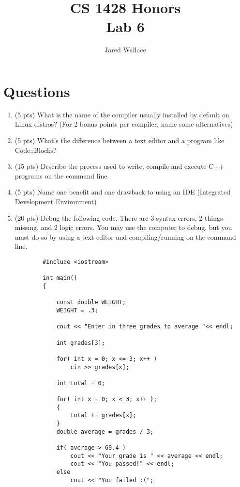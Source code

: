 \documentclass[letterpaper,12pt]{article}
\title{\Large CS 1428 Honors\\Lab 6}
\author{Jared Wallace}
\date{}
\begin{document}
\maketitle

\vspace{30mm}

\section*{Questions}

\begin{enumerate}
    \item (5 pts) What is the name of the compiler usually installed by default on Linux distros? (For 2 bonus
                  points per compiler, name some alternatives)
    \item (5 pts) What's the difference between a text editor and a program like Code::Blocks?
    \item (15 pts) Describe the process used to write, compile and execute C++ programs on the command line.
    \item (5 pts) Name one benefit and one drawback to using an IDE (Integrated Development Environment)
    \item (20 pts) Debug the following code. There are 3 syntax errors, 2 things missing, and 2 logic errors.
                   You may use the computer to debug, but you must do so by using a text editor and compiling/running
                   on the command line.
    \begin{lstlisting}
        #include <iostream>

        int main()
        {

            const double WEIGHT;
            WEIGHT = .3;

            cout << "Enter in three grades to average "<< endl;

            int grades[3];

            for( int x = 0; x <= 3; x++ )
                cin >> grades[x];

            int total = 0;

            for( int x = 0; x < 3; x++ );
            {
                total += grades[x];
            }
            double average = grades / 3;

            if( average > 69.4 )
                cout << "Your grade is " << average << endl;
                cout << "You passed!" << endl;
            else
                cout << "You failed :(";


\end{lstlisting}
\end{enumerate}
\end{document}
